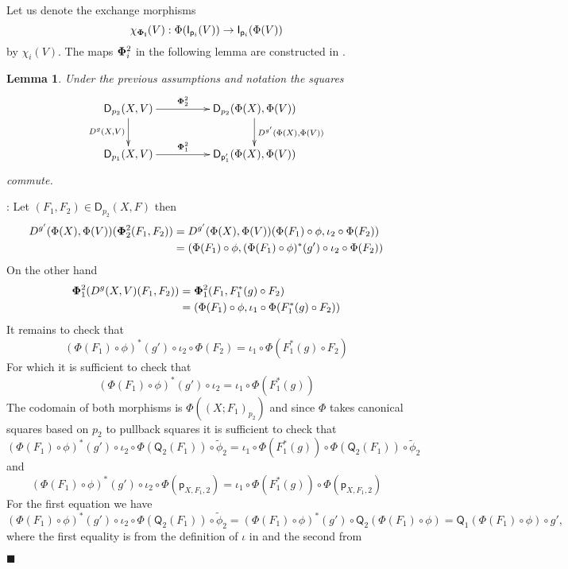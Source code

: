 \documentclass[12pt]{article}
\numberwithin{equation}{section}
\newenvironment{myproof}{{\bf Proof}:}{$\blacksquare$ \vskip 5mm }
\newtheorem{lemma}[proposition]{Lemma}
\newcommand{\llabel}[1]{\label{#1}}
\newcommand{\sr}{\rightarrow}
\newcommand{\wt}{\widetilde}
\newcommand{\p}{\mathsf{p}}
\newcommand{\D}{\mathsf{D}}
\newcommand{\I}{\mathsf{I}}
\newcommand{\Q}{\mathsf{Q}}
\begin{document}
%
Let us denote the exchange morphisms
%
$$\chi_{\bf\Phi_i}(V):\Phi(\I_{\p_i}(V))\sr \I_{\p_i}(\Phi(V))$$
%
by $\chi_i(V)$. The maps ${\bf\Phi}_i^2$ in the following lemma are constructed
in \cite[Construction 5.2]{fromunivwithPi}.
%
\begin{lemma}
\llabel{2015.04.08.l1} Under the previous assumptions and notation the squares
%
$$
\begin{xy}
          \xymatrix@C=4pc{ \D_{p_2}(X,V) \ar[r]^-{{\bf\Phi}_2^2}
            \ar[d]_{D^g(X,V)} & \D_{p_2}(\Phi(X),\Phi(V))
            \ar[d]^{D^{g'}(\Phi(X),\Phi(V))}\\ \D_{p_1}(X,V)
            \ar[r]^-{{\bf\Phi}_1^2} & \D_{\p_1'}(\Phi(X),\Phi(V)) }
\end{xy}
$$
%
commute.
\end{lemma}
%
\begin{myproof}
Let $(F_1,F_2)\in \D_{p_2}(X,F)$ then
%
\begin{align*}
  D^{g'}(\Phi(X),\Phi(V))({\bf\Phi}_2^2(F_1,F_2))
    & = D^{g'}(\Phi(X),\Phi(V))(\Phi(F_1)\circ \phi, \iota_2\circ \Phi(F_2)) \\
    & = (\Phi(F_1)\circ \phi, (\Phi(F_1)\circ \phi)^*(g')\circ \iota_2\circ \Phi(F_2))
\end{align*}
%
On the other hand
%
\begin{align*}
  {\bf\Phi}_1^2(D^g(X,V)(F_1,F_2)) 
    & = {\bf\Phi}_1^2(F_1,F_1^*(g)\circ F_2) \\
    & = (\Phi(F_1)\circ\phi,\iota_1\circ \Phi(F_1^*(g)\circ F_2))
\end{align*}
%
It remains to check that
%
$$(\Phi(F_1)\circ \phi)^*(g')\circ \iota_2\circ \Phi(F_2)=\iota_1\circ
\Phi(F_1^*(g)\circ F_2)$$
%
For which it is sufficient to check that
%
$$(\Phi(F_1)\circ \phi)^*(g')\circ \iota_2=\iota_1\circ \Phi(F_1^*(g))$$
%
The codomain of both morphisms is $\Phi((X;F_1)_{p_2})$ and since $\Phi$ takes
canonical squares based on $p_2$ to pullback squares it is sufficient to check
that
%
$$(\Phi(F_1)\circ \phi)^*(g')\circ \iota_2\circ
\Phi(\Q_2(F_1))\circ\wt{\phi}_2=\iota_1\circ \Phi(F_1^*(g))\circ
\Phi(\Q_2(F_1))\circ\wt{\phi}_2$$
%
and
%
$$(\Phi(F_1)\circ \phi)^*(g')\circ \iota_2\circ \Phi(\p_{X,F_1,2})=\iota_1\circ
\Phi(F_1^*(g))\circ \Phi(\p_{X,F_1,2})$$
%
For the first equation we have
%
$$(\Phi(F_1)\circ \phi)^*(g')\circ \iota_2\circ
\Phi(\Q_2(F_1))\circ\wt{\phi}_2=(\Phi(F_1)\circ \phi)^*(g')\circ
\Q_2(\Phi(F_1)\circ \phi)=\Q_1(\Phi(F_1)\circ\phi)\circ g',$$
%
where the first equality is from the definition of $\iota$ in
\cite[Construction 5.2]{fromunivwithPi} and the second from

\end{myproof}
\end{document}
